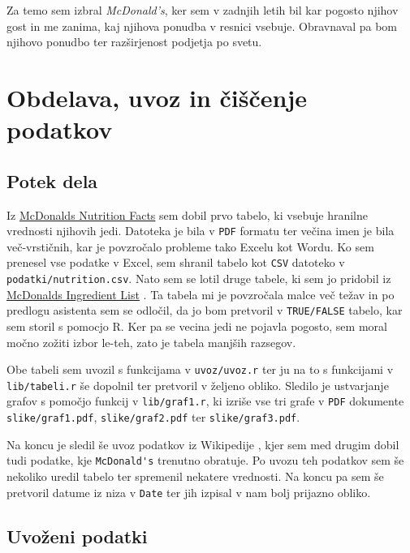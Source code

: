 \documentclass[hidelinks, 11pt,a4paper]{article}
\begin{document}
Za temo sem izbral \textit{McDonald's}, ker sem v zadnjih letih bil kar pogosto njihov gost in me zanima, kaj njihova ponudba v resnici vsebuje. Obravnaval pa bom njihovo ponudbo ter raz\-šir\-je\-nost podjetja po svetu.

\section{Obdelava, uvoz in čiščenje podatkov}

\subsection{Potek dela}

Iz \href{http://nutrition.mcdonalds.com/getnutrition/nutritionfacts.pdf}{McDonalds Nutrition Facts} \cite{bib:NutrFacts} sem dobil prvo tabelo, ki vsebuje hranilne vrednosti njihovih jedi. Datoteka je bila v \verb|PDF| formatu ter večina imen je bila več-vrstičnih, kar je povzročalo probleme tako Excelu kot Wordu. Ko sem prenesel vse podatke v Excel, sem shranil tabelo kot \verb|CSV| datoteko v \verb|podatki/nutrition.csv|. Nato sem se lotil druge tabele, ki sem jo pridobil iz \href{http://nutrition.mcdonalds.com/getnutrition/ingredientslist.pdf}{McDonalds Ingredient List} \cite{bib:IngrList}. Ta tabela mi je povzročala malce več težav in po predlogu asistenta sem se odločil, da jo bom pretvoril v \verb|TRUE/FALSE| tabelo, kar sem storil s pomocjo R. Ker pa se vecina jedi ne pojavla pogosto, sem moral močno zožiti izbor le-teh, zato je tabela manjših razsegov. \par

Obe tabeli sem uvozil s funkcijama v \verb|uvoz/uvoz.r| ter ju na to s funkcijami v \verb|lib/tabeli.r| še dopolnil ter pretvoril v željeno obliko. Sledilo je ustvarjanje grafov s pomočjo funkcij v \verb|lib/graf1.r|, ki izriše vse tri grafe v \verb|PDF| dokumente \verb|slike/graf1.pdf|, \verb|slike/graf2.pdf| ter \verb|slike/graf3.pdf|. \par

Na koncu je sledil še uvoz podatkov iz Wikipedije \cite{bib:drzave}, kjer sem med drugim dobil tudi podatke, kje \verb|McDonald's| trenutno obratuje. Po uvozu teh podatkov sem še nekoliko uredil tabelo ter spremenil nekatere vrednosti. Na koncu pa sem še pretvoril datume iz niza v \verb|Date| ter jih izpisal v nam bolj prijazno obliko.

\subsection{Uvoženi podatki}
\end{document}

